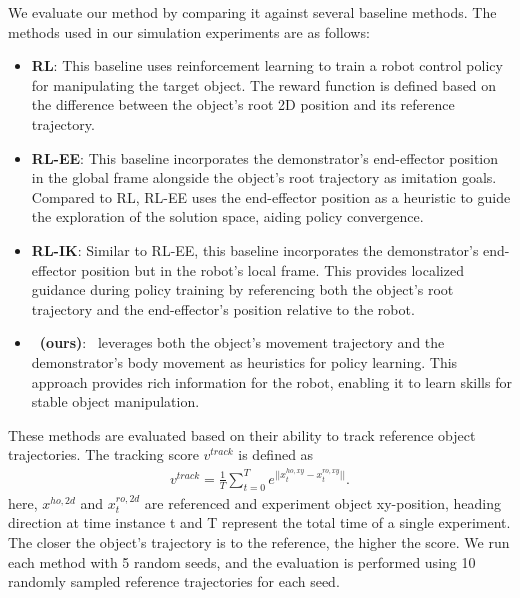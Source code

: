We evaluate our method by comparing it against several baseline methods. The methods used in our simulation experiments are as follows:

\begin{itemize} 

\item \textbf{RL}: This baseline uses reinforcement learning to train a robot control policy for manipulating the target object. The reward function is defined based on the difference between the object’s root 2D position and its reference trajectory.

\item \textbf{RL-EE}: This baseline incorporates the demonstrator's end-effector position in the global frame alongside the object’s root trajectory as imitation goals. Compared to RL, RL-EE uses the end-effector position as a heuristic to guide the exploration of the solution space, aiding policy convergence.

\item \textbf{RL-IK}: Similar to RL-EE, this baseline incorporates the demonstrator’s end-effector position but in the robot's local frame. This provides localized guidance during policy training by referencing both the object’s root trajectory and the end-effector’s position relative to the robot.

\item \textbf{\method~(ours)}: \method \ leverages both the object’s movement trajectory and the demonstrator’s body movement as heuristics for policy learning. This approach provides rich information for the robot, enabling it to learn skills for stable object manipulation.

\end{itemize}
These methods are evaluated based on their ability to track reference object trajectories. The tracking score $v^{track}$ is defined as 
\begin{align}
\label{eqn:norm_error_metric}
   v^{track} = \frac{1}{T}\sum_{t=0}^{T} e^{||x^{ho,xy}_t - x^{ro,xy}_t||} .
\end{align}
here, $x^{ho,2d}$ and $x^{ro,2d}_t$ are referenced and 
 experiment object xy-position, heading direction at time instance t and T represent the total time of a single experiment. The closer the object's trajectory is to the reference, the higher the score. We run each method with 5 random seeds, and the evaluation is performed using 10 randomly sampled reference trajectories for each seed.








